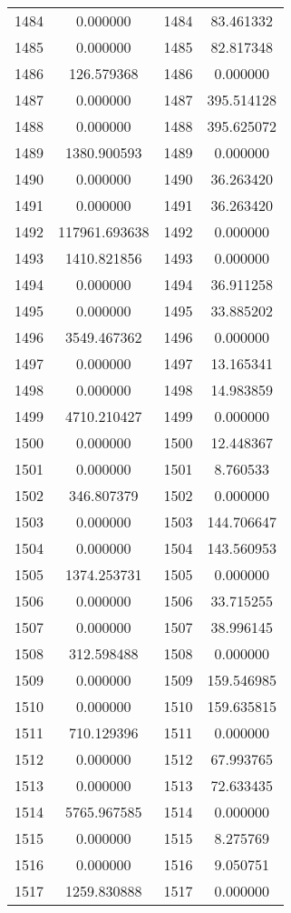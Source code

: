 \documentclass[12pt]{article}
\begin{document}
\begin{longtable}{@{}cccc@{}}
1484 & 0.000000 & 1484 & 83.461332 \\
1485 & 0.000000 & 1485 & 82.817348 \\
1486 & 126.579368 & 1486 & 0.000000 \\
1487 & 0.000000 & 1487 & 395.514128 \\
1488 & 0.000000 & 1488 & 395.625072 \\
1489 & 1380.900593 & 1489 & 0.000000 \\
1490 & 0.000000 & 1490 & 36.263420 \\
1491 & 0.000000 & 1491 & 36.263420 \\
1492 & 117961.693638 & 1492 & 0.000000 \\
1493 & 1410.821856 & 1493 & 0.000000 \\
1494 & 0.000000 & 1494 & 36.911258 \\
1495 & 0.000000 & 1495 & 33.885202 \\
1496 & 3549.467362 & 1496 & 0.000000 \\
1497 & 0.000000 & 1497 & 13.165341 \\
1498 & 0.000000 & 1498 & 14.983859 \\
1499 & 4710.210427 & 1499 & 0.000000 \\
1500 & 0.000000 & 1500 & 12.448367 \\
1501 & 0.000000 & 1501 & 8.760533 \\
1502 & 346.807379 & 1502 & 0.000000 \\
1503 & 0.000000 & 1503 & 144.706647 \\
1504 & 0.000000 & 1504 & 143.560953 \\
1505 & 1374.253731 & 1505 & 0.000000 \\
1506 & 0.000000 & 1506 & 33.715255 \\
1507 & 0.000000 & 1507 & 38.996145 \\
1508 & 312.598488 & 1508 & 0.000000 \\
1509 & 0.000000 & 1509 & 159.546985 \\
1510 & 0.000000 & 1510 & 159.635815 \\
1511 & 710.129396 & 1511 & 0.000000 \\
1512 & 0.000000 & 1512 & 67.993765 \\
1513 & 0.000000 & 1513 & 72.633435 \\
1514 & 5765.967585 & 1514 & 0.000000 \\
1515 & 0.000000 & 1515 & 8.275769 \\
1516 & 0.000000 & 1516 & 9.050751 \\
1517 & 1259.830888 & 1517 & 0.000000 \\

\end{longtable}
\end{document}
